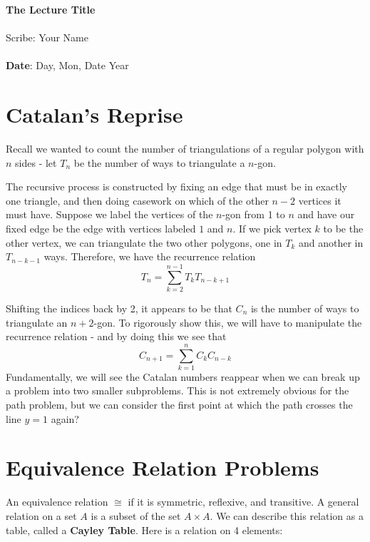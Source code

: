\documentclass[11pt,twosided]{article}
\def\titlestring{The Lecture Title}
\def\scribestring{Your Name}
\def\datestring{Day, Mon, Date Year}
\begin{document}
\thispagestyle{plain}  %

\noindent
{\LARGE \textbf{\titlestring}}\\\\
%
{\Large Scribe: \scribestring}\\ \\
{\textbf{Date}: \datestring}


\noindent

\section{Catalan's Reprise}
Recall we wanted to count the number of triangulations of a regular polygon with $n$ sides - let $T_n$ be the number of ways to triangulate a $n$-gon. 

The recursive process is constructed by fixing an edge that must be in exactly one triangle, and then doing casework on which of the other $n-2$ vertices it must have. Suppose we label the vertices of the $n$-gon from 1 to $n$ and have our fixed edge be the edge with vertices labeled $1$ and $n$. If we pick vertex $k$ to be the other vertex, we can triangulate the two other polygons, one in $T_k$ and another in $T_{n-k-1}$ ways. Therefore, we have the recurrence relation
\[
	T_n = \sum_{k=2}^{n-1} T_k T_{n-k+1}
\]

Shifting the indices back by 2, it appears to be that $C_n$ is the number of ways to triangulate an $n+2$-gon. To rigorously show this, we will have to manipulate the recurrence relation - and by doing this we see that 
\[
	C_{n+1} = \sum_{k=1}^n C_k C_{n-k}
\]
Fundamentally, we will see the Catalan numbers reappear when we can break up a problem into two smaller subproblems. This is not extremely obvious for the path problem, but we can consider the first point at which the path crosses the line $y=1$ again?

\section{Equivalence Relation Problems}
An equivalence relation $\cong$ if it is symmetric, reflexive, and transitive. A general relation on a set $A$ is a subset of the set $A \times A$. We can describe this relation as a table, called a \textbf{Cayley Table}. Here is a relation on 4 elements: 

\end{document}
